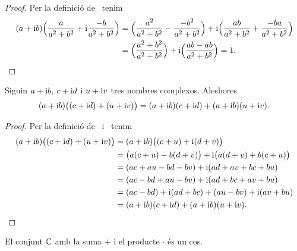 \documentclass[../Apunts.tex]{subfiles}
\begin{document}
	\begin{proof}
		Per la definició de~ tenim
		\begin{align*}
			(a+\mathrm{i} b)\Big(\frac{a}{a^{2}+b^{2}}+\mathrm{i}\frac{-b}{a^{2}+b^{2}}\Big)&=\Big(\frac{a^{2}}{a^{2}+b^{2}}-\frac{-b^{2}}{a^{2}+b^{2}}\Big)+\mathrm{i}\Big(\frac{ab}{a^{2}+b^{2}}+\frac{-ba}{a^{2}+b^{2}}\Big) \\
			&=\Big(\frac{a^{2}+b^{2}}{a^{2}+b^{2}}\Big)+\mathrm{i}\Big(\frac{ab-ab}{a^{2}+b^{2}}\Big)=1.\qedhere
		\end{align*}
	\end{proof}
	\begin{proposition}
		\label{prop:distribuitva del producte respecte la suma de nombres complexos}
		Siguin \(a+\mathrm{i} b\), \(c+\mathrm{i} d\) i \(u+\mathrm{i} v\) tres nombres complexos. Aleshores
		\[(a+\mathrm{i} b)\big((c+\mathrm{i} d)+(u+\mathrm{i} v)\big)=(a+\mathrm{i} b)(c+\mathrm{i} d)+(a+\mathrm{i} b)(u+\mathrm{i} v).\]
	\end{proposition}
	\begin{proof}
		Per la definició de~ i~ tenim
		\begin{align*}
			(a+\mathrm{i} b)\big((c+\mathrm{i} d)+(u+\mathrm{i} v)\big)&=(a+\mathrm{i} b)\big((c+u)+\mathrm{i}(d+v)\big) \\
			&=\big(a(c+u)-b(d+v)\big)+\mathrm{i}\big(a(d+v)+b(c+u)\big) \\
			&=(ac+au-bd-bv)+\mathrm{i}(ad+av+bc+bu) \\
			&=(ac-bd+au-bv)+\mathrm{i}(ad+bc+av+bu)\\
			&=(ac-bd)+\mathrm{i}(ad+bc)+(au-bv)+\mathrm{i}(av+bu) \\
			&=(a+\mathrm{i} b)(c+\mathrm{i} d)+(a+\mathrm{i} b)(u+\mathrm{i} v).\qedhere
		\end{align*}
	\end{proof}
	\begin{corollary}
		\label{cor:els complexos formen un cos}
		El conjunt \(\mathbb{C}\) amb la suma \(+\) i el producte \(\cdot\) és un cos.
	\end{corollary}
\end{document}
